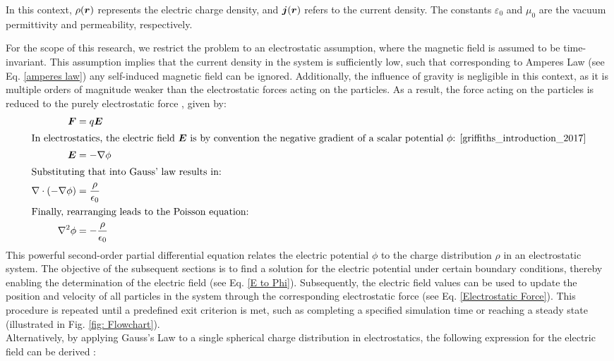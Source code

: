 In this context, $\rho(\bm{r})$ represents the electric charge density, and $\boldsymbol{j}(\bm{r})$ refers to the current density. The constants $\varepsilon_0$ and $\mu_0$ are the vacuum permittivity and permeability, respectively.

For the scope of this research, we restrict the problem to an electrostatic assumption, where the magnetic field is assumed to be time-invariant. This assumption implies that the current density in the system is sufficiently low, such that corresponding to Amperes Law (see Eq. \ref{amperes law}) any self-induced magnetic field can be ignored. Additionally, the influence of gravity is negligible in this context, as it is multiple orders of magnitude weaker than the electrostatic forces acting on the particles. As a result, the force acting on the particles is reduced to the purely electrostatic force \cite{brieda_plasma_2019}, given by:
\begin{align}
\label{Electrostatic Force}\bm{F} &= q \bm{E}\\
\intertext{In electrostatics, the electric field \(\bm{E}\) is by convention the negative gradient of a scalar potential $\phi$: \cite{griffiths_introduction_2017}}
\label{E to Phi}\bm{E} &= - \nabla \phi\\
\intertext{Substituting that into Gauss’ law results in:}
\nabla \cdot (- \nabla \phi) &= \frac{\rho}{\epsilon_0}\\
\intertext{Finally, rearranging leads to the Poisson equation:}
\label{Eq: Poissions}\nabla^2 \phi &= - \frac{\rho}{\epsilon_0}
\end{align}
This powerful second-order partial differential equation relates the electric potential \(\phi\) to the charge distribution \(\rho\) in an electrostatic system. The objective of the subsequent sections is to find a solution for the electric potential under certain boundary conditions, thereby enabling the determination of the electric field (see Eq. \ref{E to Phi}). Subsequently, the electric field values can be used to update the position and velocity of all particles in the system through the corresponding electrostatic force (see Eq. \ref{Electrostatic Force}). This procedure is repeated until a predefined exit criterion is met, such as completing a specified simulation time or reaching a steady state (illustrated in Fig. \ref{fig: Flowchart}).
\\\newline
Alternatively, by applying Gauss’s Law to a single spherical charge distribution in electrostatics, the following expression for the electric field can be derived \cite{zangwill_modern_2013}:
